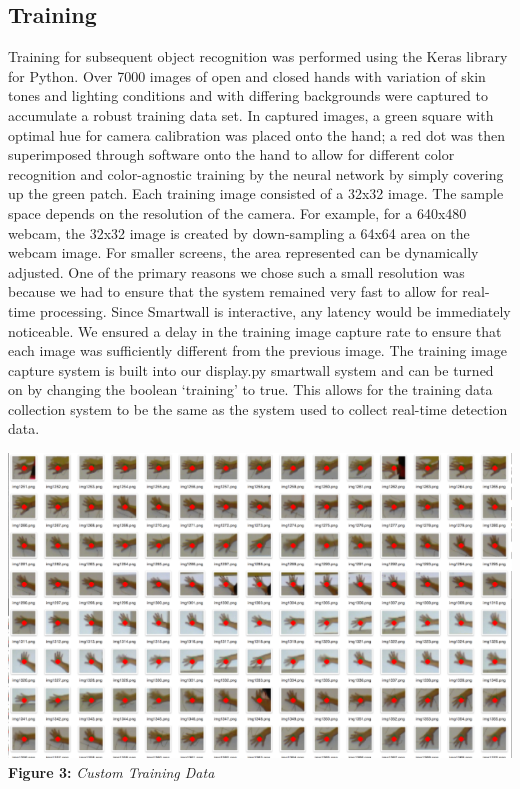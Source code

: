\documentclass[twoside,twocolumn]{article}
\begin{document}
\subsection{Training}
Training for subsequent object recognition was performed using the Keras library for Python. Over 7000 images of open and closed hands with variation of skin tones and lighting conditions and with differing backgrounds were captured to accumulate a robust training data set. In captured images, a green square with optimal hue for camera calibration was placed onto the hand; a red dot was then superimposed through software onto the hand to allow for different color recognition and color-agnostic training by the neural network by simply covering up the green patch. Each training image consisted of a 32x32 image. The sample space depends on the resolution of the camera. For example, for a 640x480 webcam, the 32x32 image is created by down-sampling a 64x64 area on the webcam image. For smaller screens, the area represented can be dynamically adjusted. One of the primary reasons we chose such a small resolution was because we had to ensure that the system remained very fast to allow for real-time processing. Since Smartwall is interactive, any latency would be immediately noticeable. We ensured a delay in the training image capture rate to ensure that each image was sufficiently different from the previous image. The training image capture system is built into our display.py smartwall system and can be turned on by changing the boolean `training' to true. This allows for the training data collection system to be the same as the system used to collect real-time detection data.

\begin{center}
\includegraphics[scale=0.27]{training_data} \\
\vspace{0.25cm}
\small{\textbf{Figure 3:} \textit{Custom Training Data}}
\end{center}
\end{document}
